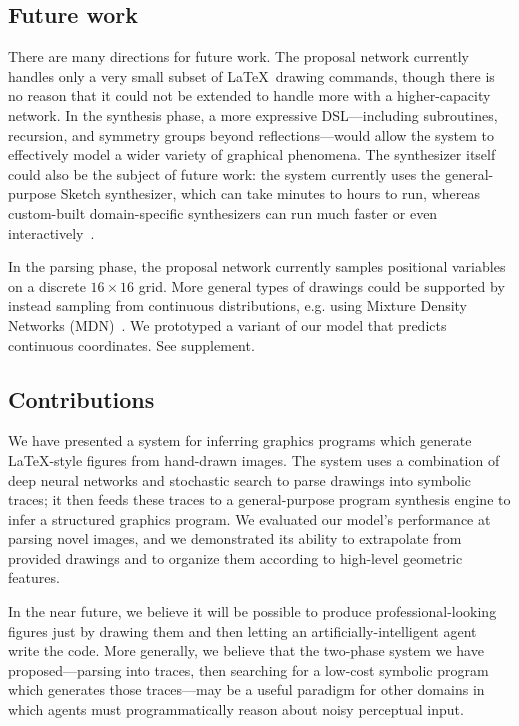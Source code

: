 \documentclass{article}
\begin{document}
\subsection{Future work}
There are many directions for future work. The proposal network  currently handles only a very small subset of \LaTeX~drawing commands, though there is no reason that it could not be extended to handle more with a higher-capacity network.
In the synthesis phase, a more expressive DSL---including subroutines, recursion, and symmetry groups beyond reflections---would allow the system to effectively model a wider variety of graphical phenomena. The synthesizer itself could also be the subject of future work: the system currently uses the general-purpose Sketch synthesizer, which can take minutes to hours to run, whereas custom-built domain-specific synthesizers can run much faster or even interactively~\cite{le2014flashextract}.

In the parsing phase, the proposal network currently samples positional variables on a discrete $16\times 16$ grid. More general types of drawings could be supported by instead sampling from continuous distributions, e.g. using Mixture Density Networks (MDN)~\cite{MDN}.
We prototyped a variant of our model that predicts continuous coordinates. See supplement.

\subsection{Contributions}

We have presented a system for inferring graphics programs which generate \LaTeX-style figures from hand-drawn images. The system uses a combination of deep neural networks and stochastic search to parse drawings into symbolic traces; it then feeds these traces to a general-purpose program synthesis engine to infer a structured graphics program. We evaluated our model's performance at parsing novel images, and we demonstrated its ability to extrapolate from provided drawings and to organize them according to high-level geometric features.


In the near future, we believe it will be possible to produce professional-looking figures just by drawing them and then letting an artificially-intelligent agent write the code.
More generally, we believe that the two-phase system we have proposed---parsing into traces, then searching for a low-cost symbolic program which generates those traces---may be a useful paradigm for other domains in which agents must programmatically reason about noisy perceptual input.
\end{document}
